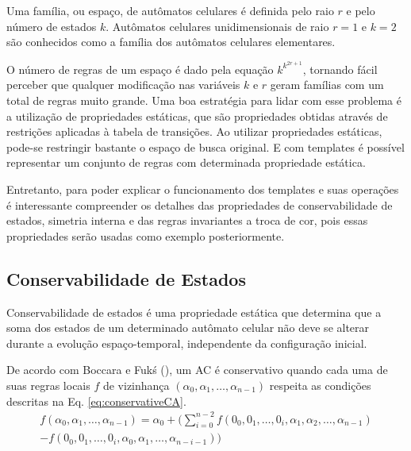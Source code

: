 \documentclass[12pt, a4paper]{article}
\begin{document}
Uma família, ou espaço, de autômatos celulares é definida pelo raio $r$ e pelo número de estados $k$. Autômatos celulares unidimensionais de raio $r=1$ e $k=2$ são conhecidos como a família dos autômatos celulares elementares.

O número de regras de um espaço é dado pela equação $k^{k^{2r+1}}$, tornando fácil perceber que qualquer modificação nas variáveis $k$ e $r$ geram famílias com um total de regras muito grande. Uma boa estratégia para lidar com esse problema é a utilização de propriedades estáticas, que são propriedades obtidas através de restrições aplicadas à tabela de transições. Ao utilizar propriedades estáticas, pode-se restringir bastante o espaço de busca original. E com templates é possível representar um conjunto de regras com determinada propriedade estática.

Entretanto, para poder explicar o funcionamento dos templates e suas operações é interessante compreender os detalhes das propriedades de conservabilidade de estados, simetria interna e das regras invariantes a troca de cor, pois essas propriedades serão usadas como exemplo posteriormente.

\subsection{Conservabilidade de Estados}
Conservabilidade de estados é uma propriedade estática que determina que a soma dos estados de um determinado autômato celular não deve se alterar durante a evolução espaço-temporal, independente da configuração inicial.

De acordo com Boccara e Fukś (\citeyear{boccara2002}), um AC é conservativo quando cada uma de suas regras locais $f$ de vizinhança $(\alpha_0,\alpha_1, \dots, \alpha_{n-1})$ respeita as condições descritas na Eq. \eqref{eq:conservativeCA}.
\begin{equation}
\begin{split}
f(\alpha_0,\alpha_1, \dots,\alpha_{n-1}) = \alpha_0 + (\sum_{i=0}^{n-2}f(0_0,0_1, \dots,0_i,\alpha_1,\alpha_2, \dots,\alpha_{n-1}) \\- f(0_0,0_1, \dots,0_i,\alpha_0,\alpha_1, \dots,\alpha_{n-i-1}))
\label{eq:conservativeCA}
\end{split}
\end{equation}

\end{document}
